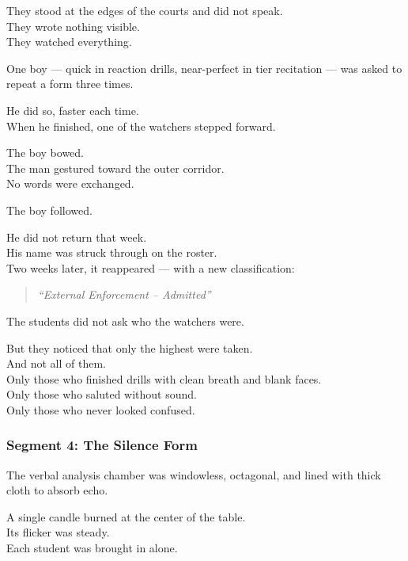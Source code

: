 \documentclass[9pt]{article}
\begin{document}
They stood at the edges of the courts and did not speak.\\
They wrote nothing visible.\\
They watched everything.

\vspace{1em}

One boy — quick in reaction drills, near-perfect in tier recitation — was asked to repeat a form three times.

He did so, faster each time.\\
When he finished, one of the watchers stepped forward.

The boy bowed.\\
The man gestured toward the outer corridor.\\
No words were exchanged.

The boy followed.

He did not return that week.\\
His name was struck through on the roster.\\
Two weeks later, it reappeared — with a new classification:

\begin{quote}
\textit{“External Enforcement – Admitted”}
\end{quote}

\vspace{1em}

The students did not ask who the watchers were.

But they noticed that only the highest were taken.\\
And not all of them.\\

Only those who finished drills with clean breath and blank faces.\\

Only those who saluted without sound.\\

Only those who never looked confused.

\newpage

\subsubsection*{Segment 4: The Silence Form}

The verbal analysis chamber was windowless, octagonal, and lined with thick cloth to absorb echo.

A single candle burned at the center of the table.\\
Its flicker was steady.\\
Each student was brought in alone.
\end{document}
